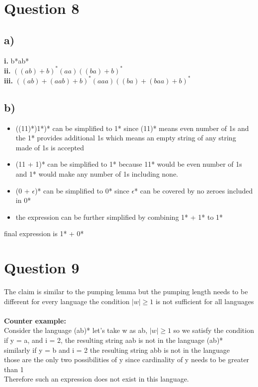 \documentclass[11pt]{article}
\begin{document}
\section*{Question 8}
\subsection*{a)}
\textbf{i.} b*ab* \\
%
\textbf{ii.}
$((ab) + b)^*
(aa)
((ba) + b)^*$ \\
%
\textbf{iii.}
$((ab) + (aab) + b)^*
(aaa)
((ba) + (baa) + b)^*$ \\

\subsection*{b)}
\begin{itemize}
    \item ((11)*)1*)* can be simplified to 1* since (11)* means even number of
          1s and the 1* provides additional 1s which means an empty string
          of any string made of 1s is accepted
    \item (11 + 1)* can be simplified to 1* because 11* would be even number of
        1s and 1* would make any number of 1s including none.
    \item (0 + $\epsilon$)* can be simplified to 0* since $\epsilon$* can be
        covered by no zeroes included in 0*
    \item the expression can be further simplified by combining 1* + 1* to 1*
\end{itemize}
final expression is 1* + 0*

\section*{Question 9}
The claim is similar to the pumping lemma but the pumping length needs to be
different for every language the condition $|w| \ge 1$ is not sufficient for
all languages \\
\\
\textbf{Counter example:} \\
Consider the language (ab)* let's take w as ab, $|w| \ge 1$ so we satisfy
the condition \\
if y = a, and i = 2, the resulting string aab is not in the language (ab)* \\
similarly if y = b and i = 2 the resulting string abb is not in the language \\
those are the only two possibilities of y since cardinality of y needs to be
greater than 1 \\
Therefore such an expression does not exist in this language.
\end{document}
